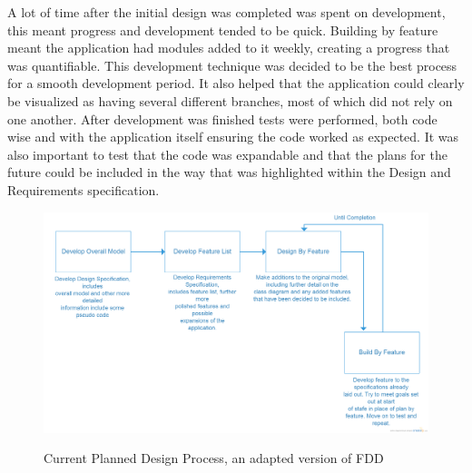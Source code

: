 A lot of time after the initial design was completed was spent on development, this meant progress and development tended to be quick. Building by feature meant the application had modules added to it weekly, creating a progress that was quantifiable. This development technique was decided to be the best process for a smooth development period. It also helped that the application could clearly be visualized as having several different branches, most of which did not rely on one another. After development was finished tests were performed, both code wise and with the application itself ensuring the code worked as expected. It was also important to test that the code was expandable and that the plans for the future could be included in the way that was highlighted within the Design and Requirements specification. \\
\begin{figure}[h]
\includegraphics[scale=0.18]{Chapter1/process.png}\\
 \caption[Design Process]{Current Planned Design Process, an adapted version of FDD}
\end{figure}

